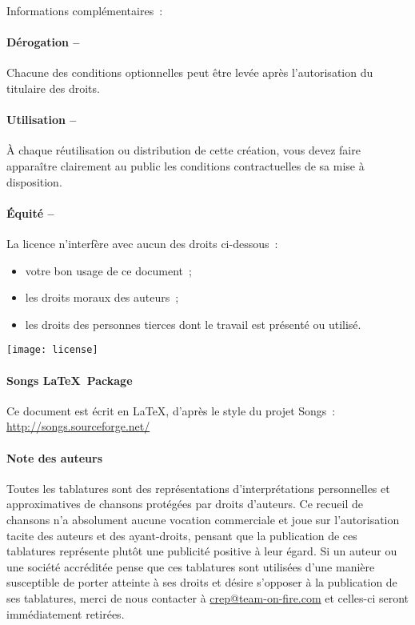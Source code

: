 \begin{lblock}{Informations complémentaires~:}
  
  \hspace{0.4cm}
  \parbox{15cm}{
    \paragraph{Dérogation --} 
    Chacune des conditions optionnelles peut être levée après
    l'autorisation du titulaire des droits.
       
    \paragraph{Utilisation --} 
    À chaque réutilisation ou distribution de cette création, vous
    devez faire apparaître clairement au public les conditions
    contractuelles de sa mise à disposition.

    \paragraph{Équité --} 
    La licence n'interfère avec aucun des droits ci-dessous~:
    \begin{itemize}
    \item votre bon usage de ce document~;
    \item les droits moraux des auteurs~;
    \item les droits des personnes tierces dont le travail est
      présenté ou utilisé.
    \end{itemize}
  }

  \begin{center}
    \texttt{[image: license]}
  \end{center}

\end{lblock}
\paragraph{Songs \LaTeX~Package}
Ce document est écrit en \LaTeX, d'après le style du projet Songs~:
\url{http://songs.sourceforge.net/}

\paragraph{Note des auteurs}
Toutes les tablatures sont des représentations d'interprétations
personnelles et approximatives de chansons protégées par droits
d'auteurs. Ce recueil de chansons n'a absolument aucune vocation
commerciale et joue sur l'autorisation tacite des auteurs et des
ayant-droits, pensant que la publication de ces tablatures représente
plutôt une publicité positive à leur égard. Si un auteur ou une
société accréditée pense que ces tablatures sont utilisées d'une
manière susceptible de porter atteinte à ses droits et désire
s'opposer à la publication de ses tablatures, merci de nous contacter
à \url{crep@team-on-fire.com} et celles-ci seront immédiatement
retirées.
